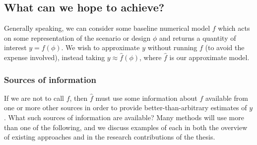 \documentclass{puthesis}
\begin{document}
\subsection{What can we hope to achieve?}

Generally speaking, we can consider some baseline numerical model $f$ which acts on some
representation of the scenario or design $\phi$ and returns a quantity of interest $y = f(\phi)$.
We wish to approximate $y$ without running $f$ (to avoid the expense involved),
instead taking $y \approx \hat{f}(\phi)$, where $\hat{f}$ is our approximate model.

\subsubsection{Sources of information}
If we are not to call $f$, then $\hat{f}$ must use some information about $f$
available from one or more other sources in order to provide better-than-arbitrary
estimates of $y$. What such sources of information are available?
Many methods will use more than one of the following, and we discuss examples of each
in both the overview of existing approaches and in the research contributions of
the thesis.
\end{document}
